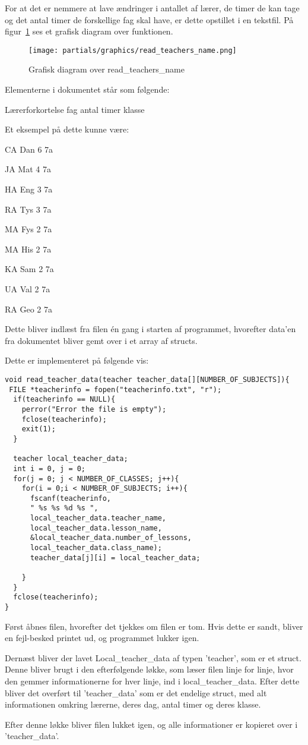 For at det er nemmere at lave ændringer i antallet af lærer, de timer de kan tage og det antal timer de forskellige fag skal have, er dette opstillet i en tekstfil. På figur~\ref{fig:datacollect} ses et grafisk diagram over funktionen.
\begin{figure}[!h]
\texttt{[image: partials/graphics/read\_teachers\_name.png]}
\caption{Grafisk diagram over read\_teachers\_name}
\label{fig:datacollect}
\end{figure}
Elementerne i dokumentet står som følgende:

Lærerforkortelse fag antal timer klasse

Et eksempel på dette kunne være:

    CA Dan 6 7a

    JA Mat 4 7a

    HA Eng 3 7a

    RA Tys 3 7a

    MA Fys 2 7a

    MA His 2 7a

    KA Sam 2 7a

    UA Val 2 7a

    RA Geo 2 7a

Dette bliver indlæst fra filen én gang i starten af programmet, hvorefter data’en fra dokumentet bliver gemt over i et array af structs.

Dette er implementeret på følgende vis:

\begin{lstlisting}
void read_teacher_data(teacher teacher_data[][NUMBER_OF_SUBJECTS]){
 FILE *teacherinfo = fopen("teacherinfo.txt", "r");
  if(teacherinfo == NULL){
    perror("Error the file is empty");
    fclose(teacherinfo);
    exit(1);
  }

  teacher local_teacher_data;
  int i = 0, j = 0;
  for(j = 0; j < NUMBER_OF_CLASSES; j++){
    for(i = 0;i < NUMBER_OF_SUBJECTS; i++){
      fscanf(teacherinfo,
      " %s %s %d %s ",
      local_teacher_data.teacher_name, 
      local_teacher_data.lesson_name, 
      &local_teacher_data.number_of_lessons, 
      local_teacher_data.class_name);
      teacher_data[j][i] = local_teacher_data; 
  
    } 
  }  
  fclose(teacherinfo);
}
\end{lstlisting}

Først åbnes filen, hvorefter det tjekkes om filen er tom. Hvis dette er sandt, bliver en fejl-besked printet ud, og programmet lukker igen.

Dernæst bliver der lavet Local\_teacher\_data af typen ’teacher’, som er et struct. Denne bliver brugt i den efterfølgende løkke, som læser filen linje for linje, hvor den gemmer informationerne for hver linje, ind i local\_teacher\_data. Efter dette bliver det overført til ’teacher\_data’ som er det endelige struct, med alt informationen omkring lærerne, deres dag, antal timer og deres klasse.
 
Efter denne løkke bliver filen lukket igen, og alle informationer er kopieret over i ’teacher\_data’.